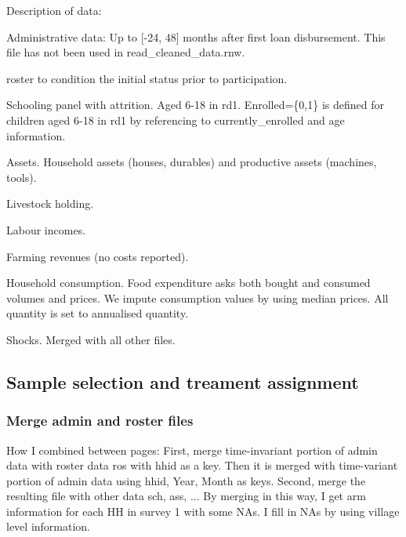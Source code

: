 Description of data:
\begin{description}
\vspace{1.0ex}\setlength{\itemsep}{1.0ex}\setlength{\baselineskip}{12pt}
\item[ad]	Administrative data: Up to [-24, 48] months after first loan disbursement. This file has not been used in \textsf{read\_cleaned\_data.rnw}.
\item[ros]	 \textsf{roster} to condition the initial status prior to participation.
\item[sch]	Schooling panel with attrition. Aged 6-18 in rd1. \textsf{Enrolled=\{0,1\}} is defined for children aged 6-18 in rd1 by referencing to \textsf{currently\_enrolled} and age information.
\item[ass]	 Assets. Household assets (houses, durables) and productive assets (machines, tools). 
\item[lvo]	Livestock holding. 
\item[lab]	Labour incomes.
\item[far]	Farming revenues (no costs reported).
\item[con]	Household consumption. Food expenditure asks both bought and consumed volumes and prices. We impute consumption values by using median prices. All quantity is set to annualised quantity.
\item[shk]	Shocks. Merged with all other files.
\end{description}

\subsection{Sample selection and treament assignment}

\subsubsection{Merge admin and roster files}







How I combined between pages: First, merge time-invariant portion of admin data with roster data \textsf{ros} with \textsf{hhid} as a key. Then it is merged with time-variant portion of admin data using \textsf{hhid, Year, Month} as keys. %
Second, merge the resulting file with other data \textsf{sch}, \textsf{ass}, ... By merging in this way, I get arm information for each HH in survey 1 with some NAs. I fill in NAs by using village level information.

